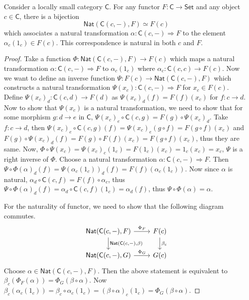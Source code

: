 \begin{thm} Consider a locally small category $\mathsf{C}$. For any functor $F:\mathsf{C}\rightarrow \mathsf{Set}$ and any object $c\in\mathsf{C}$, there is a bijection
\begin{equation}
\mathsf{Nat}(\mathsf{C}(c,-),F)\simeq F(c)
\end{equation}
which associates a natural transformation $\alpha:\mathsf{C}(c,-)\Rightarrow F$ to the element $\alpha_c(1_c)\in F(c)$. This correspondence is natural in both $c$ and $F$.
\end{thm}
\begin{proof} Take a function $\Phi:\mathsf{Nat}(\mathsf{C}(c,-),F)\rightarrow F(c)$ which maps a natural transformation $\alpha:\mathsf{C}(c,-)\Rightarrow F$ to $\alpha_c(1_c)$ where $\alpha_c:\mathsf{C}(c,c)\rightarrow F(c)$. Now we want to define an inverse function $\Psi:F(c)\rightarrow \mathsf{Nat}(\mathsf{C}(c,-),F)$ which constructs a natural transformation $\Psi(x_c):\mathsf{C}(c,-)\Rightarrow F$ for $x_c\in F(c)$. Define $\Psi(x_c)_d:\mathsf{C}(c,d)\rightarrow F(d)$  as $\Psi(x_c)_d(f)=F(f)(x_c)$ for $f:c\rightarrow d$. Now to show that $\Psi(x_c)$ is a natural transformation, we need to show that for some morphism $g:d\rightarrow e$ in $\mathsf{C}$, $\Psi(x_c)_e\circ \mathsf{C}(c,g)=F(g)\circ \Psi(x_c)_d$. Take $f:c\rightarrow d$, then $\Psi(x_c)_e\circ \mathsf{C}(c,g)(f)=\Psi(x_c)_e(g\circ f)=F(g\circ f)(x_c)$ and $F(g)\circ \Psi(x_c)_d(f)=F(g)\circ F(f)(x_c)=F(g\circ f)(x_c)$, thus they are same. Now, $\Phi\circ \Psi(x_c)=\Psi(x_c)_c(1_c)=F(1_c)(x_c)=1_c(x_c)=x_c$, $\Psi$ is a right inverse of $\Phi$. Choose a natural transformation $\alpha:\mathsf{C}(c,-)\Rightarrow F$. Then $\Psi\circ \Phi(\alpha)_d(f)=\Psi(\alpha_c (1_c))_d(f)=F(f)(\alpha_c(1_c))$. Now since $\alpha$ is natural, $\alpha_d\circ \mathsf{C}(c,f)=F(f)\circ \alpha_c$, thus $\Psi\circ \Phi(\alpha)_d(f)=\alpha_d\circ \mathsf{C}(c,f)(1_c)=\alpha_d(f)$, thus $\Psi\circ \Phi(\alpha)=\alpha$.

For the naturality of functor, we need to show that the following diagram commutes.
\begin{equation}
\begin{tikzcd}
\mathsf{Nat}(\mathsf{C}(c,-),F)\arrow{r}{\Phi_F} \arrow{d}{\mathsf{Nat}(\mathsf{C}(c,-),\beta)}&F(c)\arrow{d}{\beta_c}\\
\mathsf{Nat}(\mathsf{C}(c,-),G)\arrow{r}{\Phi_G} & G(c)
\end{tikzcd}
\end{equation}
Choose $\alpha\in\mathsf{Nat}(\mathsf{C}(c,-),F)$. Then the above statement is equivalent to $\beta_c(\Phi_F(\alpha))=\Phi_G(\beta\circ \alpha)$. Now $\beta_c(\alpha_c(1_c))=\beta_c\circ \alpha_c(1_c)=(\beta\circ \alpha)_c(1_c)=\Phi_G(\beta\circ \alpha)$.


\end{proof}
